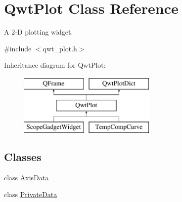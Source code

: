 \hypertarget{class_qwt_plot}{\section{Qwt\-Plot Class Reference}
\label{class_qwt_plot}
}


A 2-\/\-D plotting widget.  




{\ttfamily \#include $<$qwt\-\_\-plot.\-h$>$}

Inheritance diagram for Qwt\-Plot\-:\begin{figure}[H]
\begin{center}
\leavevmode
\includegraphics[height=3.000000cm]{class_qwt_plot}
\end{center}
\end{figure}
\subsection*{Classes}
\begin{DoxyCompactItemize}
\item 
class \hyperlink{class_qwt_plot_1_1_axis_data}{Axis\-Data}
\item 
class \hyperlink{class_qwt_plot_1_1_private_data}{Private\-Data}
\end{DoxyCompactItemize}

